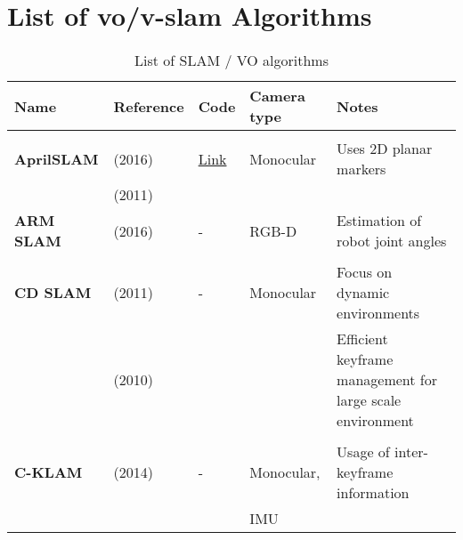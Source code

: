 \section{List of \acrshort{vo}/\acrshort{v-slam} Algorithms}
\label{section:A.1}
	{\footnotesize
		\begin{longtable}{l|l|l|l|l}
			\caption{List of SLAM / VO algorithms \cite{chris}}\\[2mm]
			\textbf{Name} & \textbf{Reference} & \textbf{Code} & \textbf{Camera type} & \textbf{Notes}\\
			\hline
			&                                   &                                                                    &                       &\\
			\textbf{AprilSLAM}     & \cite{Wang2016} (2016)            & \href{https://github.com/ProjectArtemis/aprilslam}{Link}           & Monocular             & Uses 2D planar markers\\
			& \cite{Olson2011} (2011)           &                                                                    &                       &\\
			\textbf{ARM SLAM}      & \cite{Klingensmith2016} (2016)    & -                                                                  & RGB-D                 & Estimation of robot joint angles\\
			&                                   &                                                                    &                       &\\
			\textbf{CD SLAM}       & \cite{Pirker2011} (2011)          & -                                                                  & Monocular             & Focus on dynamic environments\\
			& \cite{Pirker2010} (2010)          &                                                                    &                       & Efficient keyframe management for large scale environment\\
			&                                   &                                                                    &                       &\\
			\textbf{C-KLAM}        & \cite{Nerurkar2014} (2014)        & -                                                                  & Monocular,            & Usage of inter-keyframe information\\
			&                                   &                                                                    & IMU                   &\\

\end{longtable}}
